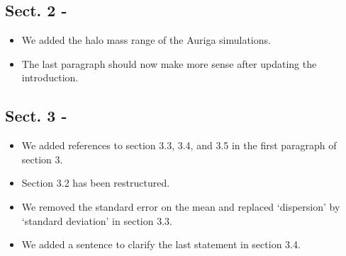 \documentclass{article}
\begin{document}
\subsection*{Sect. 2 -}
\begin{itemize}
\item We added the halo mass range of the Auriga simulations.
\item The last paragraph should now make more sense after updating the introduction.
\end{itemize}

\subsection*{Sect. 3 -}
\begin{itemize}
\item We added references to section 3.3, 3.4, and 3.5 in the first paragraph of section 3.
\item Section 3.2 has been restructured.
\item We removed the standard error on the mean and replaced `dispersion' 
by `standard deviation' in section 3.3.
\item We added a sentence to clarify the last statement in section 3.4.
\end{itemize}
\end{document}
